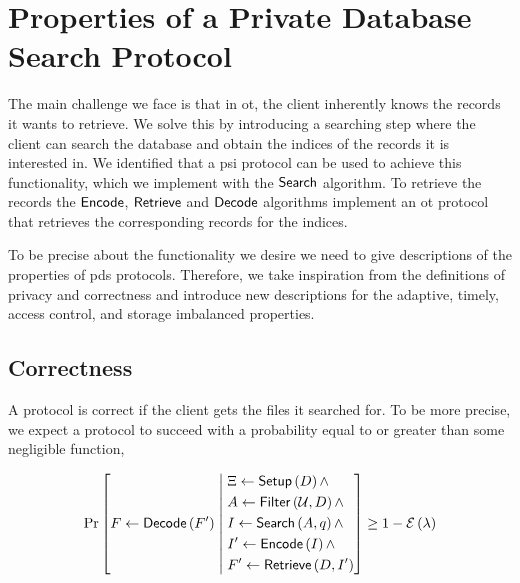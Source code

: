 \newcommand{\Query}{\ensuremath{\mathsf{{query}}}}
\newcommand{\Oracle}{\ensuremath{\mathsf{{Oracle}}}}
\newcommand{\Adv}{\ensuremath{\mathsf{{Adv}}}}
\section{Properties of a Private Database Search Protocol}
\label{sec:PDSproperties}

The main challenge we face is that in \acrshort{ot}, the client inherently knows the records it wants to retrieve. We solve this by introducing a searching step where the client can search the database and obtain the indices of the records it is interested in. We identified that a \acrshort{psi} protocol can be used to achieve this functionality, which we implement with the $ \mathsf{{Search}} $ algorithm. To retrieve the records the $ \mathsf{{Encode}} $, $ \mathsf{{Retrieve}} $ and $ \mathsf{{Decode}} $ algorithms implement an \acrshort{ot} protocol that retrieves the corresponding records for the indices.

To be precise about the functionality we desire we need to give descriptions of the properties of \acrshort{pds} protocols. Therefore, we take inspiration from the definitions of privacy and correctness \cite{CCS:Henry17} and introduce new descriptions for the adaptive, timely, access control, and storage imbalanced properties. 

\subsection*{\thesubsection\quad Correctness}\label{subsec:Correctness}

A protocol is correct if the client gets the files it searched for. To be more precise, we expect a protocol to succeed with a probability equal to or greater than some negligible function,

\begin{equation*}
    \Pr \left[ F \gets \mathsf{{Decode}} \left( F' \right) \hspace*{0.1cm} \middle| \hspace*{0.1cm}
    \begin{aligned}
        & \Xi \gets \mathsf{{Setup}} \left( D \right) \land \\
        & A \gets \mathsf{{Filter}} \left( \mathcal{U}, D \right) \land \\
        & I \gets \mathsf{{Search}} \left( A, q \right) \land \\
        & I' \gets \mathsf{{Encode}} \left( I \right) \land \\
        & F' \gets \mathsf{{Retrieve}} \left( D, I' \right)
    \end{aligned} \right] \geq 1 - \mathcal{E} \left( \lambda \right)
\end{equation*}


